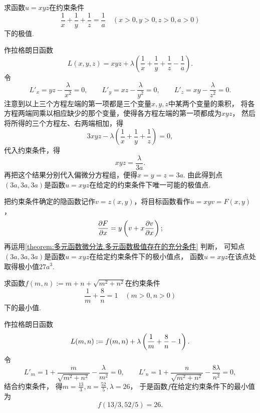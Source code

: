\begin{example}
求函数\(u=xyz\)在约束条件\begin{equation*}
	\frac{1}{x}+\frac{1}{y}+\frac{1}{z}=\frac{1}{a}
	\quad(x>0,y>0,z>0,a>0)
\end{equation*}下的极值.
\begin{solution}
作拉格朗日函数\begin{equation*}
	L(x,y,z) = xyz+\lambda\left(\frac{1}{x}+\frac{1}{y}+\frac{1}{z}-\frac{1}{a}\right).
\end{equation*}
令\begin{equation*}
	L'_x = yz - \frac{\lambda}{x^2} = 0,
	\qquad
	L'_y = xz - \frac{\lambda}{y^2} = 0,
	\qquad
	L'_z = xy - \frac{\lambda}{z^2} = 0.
\end{equation*}
注意到以上三个方程左端的第一项都是三个变量\(x,y,z\)中某两个变量的乘积，
将各方程两端同乘以相应缺少的那个变量，使得各方程左端的第一项都成为\(xyz\)，
然后将所得的三个方程左、右两端相加，得\begin{equation*}
	3xyz - \lambda\left(\frac{1}{x}+\frac{1}{y}+\frac{1}{z}\right) = 0,
\end{equation*}
代入约束条件，得\begin{equation*}
	xyz = \frac{\lambda}{3a}.
\end{equation*}
再把这个结果分别代入偏微分方程组，便得\(x = y = z = 3a\).
由此得到点\((3a,3a,3a)\)是函数\(u = xyz\)在给定的约束条件下唯一可能的极值点.

把约束条件确定的隐函数记作\(v = z(x,y)\)，将目标函数看作\(u = xyv = F(x,y)\)，\begin{equation*}
	\pdv{F}{x} = y\left(v+x\pdv{v}{x}\right);
\end{equation*}
再运用\cref{theorem:多元函数微分法.多元函数极值存在的充分条件} 判断，
可知点\((3a,3a,3a)\)是函数\(u = xyz\)在给定约束条件下的极小值点，
函数\(u = xyz\)在该点处取得极小值\(27a^3\).
\end{solution}
\end{example}

\begin{example}
求函数\(f(m,n) := m + n + \sqrt{m^2 + n^2}\)在约束条件\begin{equation*}
	\frac1m + \frac8n = 1
	\quad(m>0,n>0)
\end{equation*}
下的最小值.
\begin{solution}
作拉格朗日函数\begin{equation*}
	L(m,n)
	:=
	f(m,n) + \lambda \left( \frac1m + \frac8n - 1 \right).
\end{equation*}
令\begin{equation*}
	L'_m
	= 1 + \frac{m}{\sqrt{m^2 + n^2}} - \frac{\lambda}{m^2}
	= 0,
	\qquad
	L'_n
	= 1 + \frac{n}{\sqrt{m^2 + n^2}} - \frac{8\lambda}{n^2}
	= 0,
\end{equation*}
结合约束条件，
得\(
	m = \frac{13}{3},
	n = \frac{52}{5},
	\lambda = 26
\)，
于是函数\(f\)在给定约束条件下的最小值为\begin{equation}
	f(13/3,52/5) = 26.
\end{equation}
\end{solution}
\end{example}

